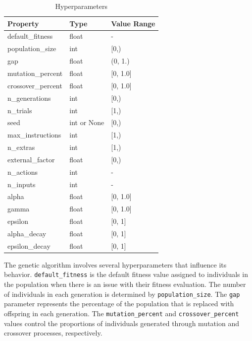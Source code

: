 \documentclass[12pt, final]{dalcsthesis}
\begin{document}
\begin{table}[!htb]
	\centering
	\begin{tabular}{|l|l|l|}
		\hline
		\textbf{Property}  & \textbf{Type} & \textbf{Value Range} \\
		\hline
		default\_fitness   & float         & -                    \\
		\hline
		population\_size   & int           & [0,)                 \\
		\hline
		gap                & float         & (0, 1.)              \\
		\hline
		mutation\_percent  & float         & [0, 1.0]             \\
		\hline
		crossover\_percent & float         & [0, 1.0]             \\
		\hline
		n\_generations     & int           & [0,)                 \\
		\hline
		n\_trials          & int           & [1,)                 \\
		\hline
		seed               & int or None   & [0,)                 \\
		\hline
		max\_instructions  & int           & [1,)                 \\
		\hline
		n\_extras          & int           & [1,)                 \\
		\hline
		external\_factor   & float         & [0,)                 \\
		\hline
		n\_actions         & int           & -                    \\
		\hline
		n\_inputs          & int           & -                    \\
		\hline
		alpha              & float         & [0, 1.0]             \\
		\hline
		gamma              & float         & [0, 1.0]             \\
		\hline
		epsilon            & float         & [0, 1]               \\
		\hline
		alpha\_decay       & float         & [0, 1]               \\
		\hline
		epsilon\_decay     & float         & [0, 1]               \\
		\hline
	\end{tabular}
	\caption{Hyperparameters}
	\label{tab:hyperparameters}
\end{table}
The genetic algorithm involves several hyperparameters that influence its behavior. \texttt{default\_fitness} is the default fitness value assigned to individuals in the population when there is an issue with their fitness evaluation. The number of individuals in each generation is determined by \texttt{population\_size}. The \texttt{gap} parameter represents the percentage of the population that is replaced with offspring in each generation. The \texttt{mutation\_percent} and \texttt{crossover\_percent} values control the proportions of individuals generated through mutation and crossover processes, respectively.
\end{document}
